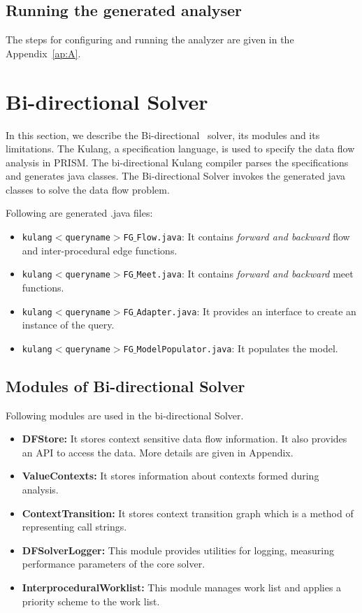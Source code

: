 \documentclass[11pt,a4paper,openright]{report}
\begin{document}
\subsection{Running the generated analyser}
The steps for configuring and running the analyzer are given in the Appendix~\ref{ap:A}.

\section{Bi-directional Solver}
In this section, we describe the Bi-directional~\cite{thesis_v} solver, its modules and its limitations.
The Kulang, a specification language, is used to specify the data flow analysis in PRISM. The bi-directional Kulang compiler parses the specifications
and generates java classes. The Bi-directional Solver invokes the generated java classes to solve the data flow problem.

Following are generated .java files:
\begin{itemize}
 \item \texttt{kulang$<$queryname$>$FG$\_$Flow.java}: It contains \textit{forward and backward} flow and inter-procedural edge functions.  
 \item \texttt{kulang$<$queryname$>$FG$\_$Meet.java}: It contains \textit{forward and backward} meet functions.
 \item \texttt{kulang$<$queryname$>$FG$\_$Adapter.java}: It provides an interface to create an instance of the query. 
 \item \texttt{kulang$<$queryname$>$FG$\_$ModelPopulator.java}: It populates the model.
\end{itemize}


\subsection{Modules of Bi-directional Solver}
Following modules are used in the bi-directional Solver.
\begin{itemize}
 \item \textbf{DFStore:} It stores context sensitive data flow information. It also provides an API to access the data. More details are given in Appendix.
 \item \textbf{ValueContexts:} It stores information about contexts formed during analysis.
 \item \textbf{ContextTransition:} It stores context transition graph which is a method of representing call strings.
 \item \textbf{DFSolverLogger:} This module provides utilities for logging, measuring performance parameters of the core solver.
 \item \textbf{InterproceduralWorklist:} This module manages work list and applies a priority scheme to the work list.
\end{itemize}
\end{document}
